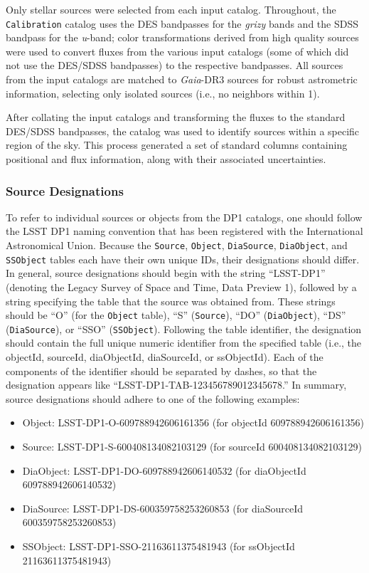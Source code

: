 \begin{itemize}
Only stellar sources were selected from each input catalog. 
Throughout, the \texttt{Calibration} catalog uses the \gls{DES} bandpasses for the \textit{grizy} bands and the \gls{SDSS} bandpass for the \textit{u}-band; color transformations derived from high quality sources were used to convert fluxes from the various input catalogs (some of which did not use the \gls{DES}/SDSS bandpasses) to the respective bandpasses. 
All sources from the input catalogs are matched to \textit{Gaia}-\gls{DR3} sources for robust astrometric information, selecting only isolated sources (i.e., no neighbors within 1\arcsec).

After collating the input catalogs and transforming the fluxes to the standard DES/SDSS bandpasses, the catalog was used to identify sources within a specific region of the sky. 
This process generated a set of standard columns containing positional and flux information, along with their associated uncertainties.
\end{itemize}

\subsubsection{Source Designations}\label{ssec:src_naming}
To refer to individual sources or objects from the DP1 catalogs, one should follow the LSST DP1 naming convention that has been registered with the International Astronomical Union.
Because the \texttt{Source}, \texttt{Object}, \texttt{DiaSource}, \texttt{DiaObject}, and \texttt{SSObject} tables each have their own unique IDs, their designations should differ.
In general, source designations should begin with the string ``LSST-DP1'' (denoting the Legacy Survey of Space and Time, Data Preview 1), followed by a string specifying the table that the source was obtained from.
These strings should be ``O'' (for the \texttt{Object} table), ``S'' (\texttt{Source}), ``DO'' (\texttt{DiaObject}), ``DS'' (\texttt{DiaSource}), or ``SSO'' (\texttt{SSObject}).
Following the table identifier, the designation should contain the full unique numeric identifier from the specified table (i.e., the objectId, sourceId, diaObjectId, diaSourceId, or ssObjectId).
Each of the components of the identifier should be separated by dashes, so that the designation appears like ``LSST-DP1-TAB-123456789012345678.''
In summary, source designations should adhere to one of the following examples:

\begin{itemize}
\item Object: LSST-DP1-O-609788942606161356 (for objectId 609788942606161356)
\item Source: LSST-DP1-S-600408134082103129 (for sourceId 600408134082103129)
\item DiaObject: LSST-DP1-DO-609788942606140532 (for diaObjectId 609788942606140532)
\item DiaSource: LSST-DP1-DS-600359758253260853 (for diaSourceId 600359758253260853)
\item SSObject: LSST-DP1-SSO-21163611375481943 (for ssObjectId 21163611375481943)
\end{itemize}

